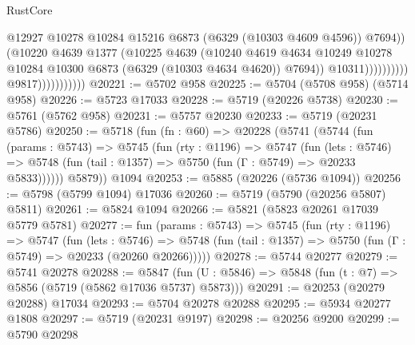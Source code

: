 \begin{lexlean}{RustCore}
\begin{coremodule}
                                                @12927
                                                @10278
                                                @10284
                                                @15216
                                                @6873
                                                (@6329 (@10303 @4609 @4596))
                                                @7694))
                                            (@10220
                                              @4639
                                              @1377
                                              (@10225
                                                @4639
                                                (@10240
                                                  @4619
                                                  @4634
                                                  @10249
                                                  @10278
                                                  @10284
                                                  @10300
                                                  @6873
                                                  (@6329 (@10303 @4634 @4620))
                                                  @7694))
                                              @10311))))))))))
                          @9817)))))))))))
@20221 := @5702 @958
@20225 := @5704 (@5708 @958) (@5714 @958)
@20226 := @5723 @17033
@20228 := @5719 (@20226 @5738)
@20230 := @5761 (@5762 @958)
@20231 := @5757 @20230
@20233 := @5719 (@20231 @5786)
@20250 := @5718
    (fun (fn : @60) =>
    @20228
      (@5741
        (@5744
          (fun (params : @5743) =>
          @5745
            (fun (rty : @1196) =>
            @5747
              (fun (lets : @5746) =>
              @5748 (fun (tail : @1357) => @5750 (fun (Γ : @5749) => @20233 @5833))))))
        @5879))
    @1094
@20253 := @5885 (@20226 (@5736 @1094))
@20256 := @5798 (@5799 @1094) @17036
@20260 := @5719 (@5790 (@20256 @5807) @5811)
@20261 := @5824 @1094
@20266 := @5821 (@5823 @20261 @17039 @5779 @5781)
@20277 := fun (params : @5743) =>
  @5745
    (fun (rty : @1196) =>
    @5747
      (fun (lets : @5746) =>
      @5748 (fun (tail : @1357) => @5750 (fun (Γ : @5749) => @20233 (@20260 @20266)))))
@20278 := @5744 @20277
@20279 := @5741 @20278
@20288 := @5847
    (fun (U : @5846) => @5848 (fun (t : @7) => @5856 (@5719 (@5862 @17036 @5737) @5873)))
@20291 := @20253 (@20279 @20288) @17034
@20293 := @5704 @20278 @20288
@20295 := @5934 @20277 @1808
@20297 := @5719 (@20231 @9197)
@20298 := @20256 @9200
@20299 := @5790 @20298

\end{coremodule}
\end{lexlean}
